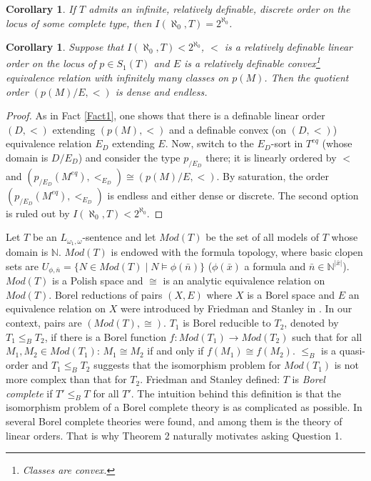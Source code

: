 \documentclass[12pt]{amsart}
\newtheorem{Corollary}[Theorem]{Corollary}
\theoremstyle{definition}
\begin{document}
 

\begin{Corollary}
If $T$ admits an infinite, relatively definable, discrete order on the locus of some complete type, then $I(\aleph_0,T)=2^{\aleph_0}$. 
\end{Corollary}

\begin{Corollary}\label{Corolary_Econvex}
Suppose that $I(\aleph_0,T)<2^{\aleph_0}$,  $<$ is a relatively definable linear order on the locus of $p\in S_1(T)$ and $E$ is a relatively definable convex\footnote{Classes are convex.} equivalence relation with infinitely many classes on $p(M)$. Then the quotient order $(p(M)/E,<)$ is dense and endless. 
\end{Corollary}
\begin{proof}
 As in Fact \ref{Fact1},  one shows that there is a definable linear order  $(D,<)$  extending $(p(M),<)$ and a definable   convex (on $(D,<)$) equivalence relation $E_D$ extending $E$. Now, switch to the $E_D$-sort in $T^{eq}$ (whose domain is $D/E_D$) and consider the type $p_{/E_D}$ there; it is linearly ordered by $<$ and $(p_{/E_D}(M^{eq}),<_{E_D}) \cong (p(M)/E,<)$. By saturation, the order $(p_{/E_D}(M^{eq}),<_{E_D})$ is  endless and either dense or discrete. The second option is ruled out by $I(\aleph_0,T)<2^{\aleph_0}$. 
\end{proof}

 

Let  $T$ be an $L_{\omega_1,\omega}$-sentence and let $Mod(T)$ be the set of all models of $T$ whose domain is $\mathbb N$. $Mod(T)$ is endowed with the formula topology, 
where basic clopen sets are $U_{\phi,\bar n}=\{N\in Mod(T)\mid N\models \phi(\bar n)\}$ 
($\phi(\bar x)$ a formula and $\bar n\in\mathbb N^{|\bar x|}$). 
$Mod(T)$ is a Polish space and $\cong$ is an analytic equivalence relation on $Mod(T)$. 
Borel reductions of pairs $(X,E)$ where $X$ is a Borel space and $E$ an equivalence relation on $X$ 
were introduced by Friedman and Stanley in \cite{FS}. 
In our context, pairs are $(Mod(T),\cong)$. $T_1$ is Borel reducible to $T_2$, denoted by $T_1\leq_B T_2$,  if there is a Borel function 
$f:Mod(T_1)\to Mod(T_2)$ such that for all $M_1,M_2\in Mod(T_1)$: $M_1\cong M_2$ if and only if $f(M_1)\cong f(M_2)$. 
$\leq_B$ is a  quasi-order and $T_1\leq_B T_2$ suggests that the  isomorphism problem for $Mod(T_1)$ is not more  complex than that for $T_2$.  Friedman and Stanley defined: 
$T$ is {\it Borel complete} if $T'\leq_B T$ for all $T'$. The intuition behind this definition is that  the isomorphism problem of a Borel complete theory is as complicated as possible.  In \cite{FS} 
several Borel complete theories were found, and among them is the theory of linear orders.  
That is why Theorem 2 naturally motivates asking Question 1. 
\end{document}
